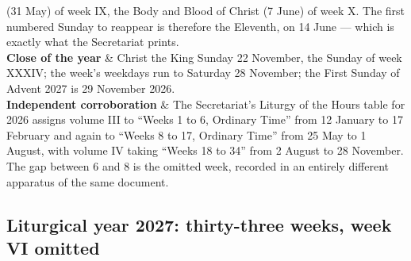 \begin{ruletable}
(31 May) of week IX, the Body and Blood of Christ (7 June) of week X. The first numbered Sunday to
reappear is therefore the Eleventh, on 14 June --- which is exactly what the Secretariat prints.\\
\textbf{Close of the year} & Christ the King Sunday 22 November, the Sunday of week XXXIV; the week's
weekdays run to Saturday 28 November; the First Sunday of Advent 2027 is 29 November 2026.\\
\textbf{Independent corroboration} & The Secretariat's Liturgy of the Hours table for 2026 assigns
volume III to ``Weeks 1 to 6, Ordinary Time'' from 12 January to 17 February and again to ``Weeks 8
to 17, Ordinary Time'' from 25 May to 1 August, with volume IV taking ``Weeks 18 to 34'' from 2
August to 28 November. The gap between 6 and 8 is the omitted week, recorded in an entirely
different apparatus of the same document.\\
\end{ruletable}

\subsection{Liturgical year 2027: thirty-three weeks, week VI omitted}

